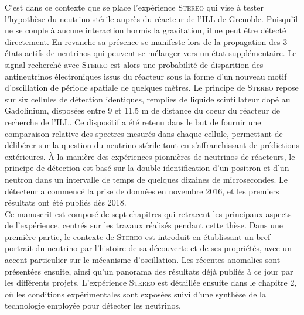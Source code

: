 C'est dans ce contexte que se place l'expérience \textsc{Stereo} qui vise à tester l'hypothèse du neutrino stérile auprès du réacteur de l'ILL de Grenoble. Puisqu'il ne se couple à aucune interaction hormis la gravitation, il ne peut être détecté directement. En revanche sa présence se manifeste lors de la propagation des 3 états actifs de neutrinos qui peuvent se mélanger vers un état supplémentaire. Le signal recherché avec \textsc{Stereo} est alors une probabilité de disparition des antineutrinos électroniques issus du réacteur sous la forme d'un nouveau motif d'oscillation de période spatiale de quelques mètres. Le principe de \textsc{Stereo} repose sur six cellules de détection identiques, remplies de liquide scintillateur dopé au Gadolinium, disposées entre 9 et 11,5 m de distance du coeur du réacteur de recherche de l'ILL. Ce dispositif a été retenu dans le but de fournir une comparaison relative des spectres mesurés dans chaque cellule, permettant de délibérer sur la question du neutrino stérile tout en s'affranchissant de prédictions extérieures. À la manière des expériences pionnières de neutrinos de réacteurs, le principe de détection est basé sur la double identification d'un positron et d'un neutron dans un intervalle de temps de quelques dizaines de microsecondes. Le détecteur a commencé la prise de données en novembre 2016, et les premiers résultats ont été publiés dès 2018.\\

Ce manuscrit est composé de sept chapitres qui retracent les principaux aspects de l'expérience, centrés sur les travaux réalisés pendant cette thèse. Dans une première partie, le contexte de \textsc{Stereo} est introduit en établissant un bref portrait du neutrino par l'histoire de sa découverte et de ses propriétés, avec un accent particulier sur le mécanisme d'oscillation. Les récentes anomalies sont présentées ensuite, ainsi qu'un panorama des résultats déjà publiés à ce jour par les différents projets. L'expérience \textsc{Stereo} est détaillée ensuite dans le chapitre 2, où les conditions expérimentales sont exposées suivi d'une synthèse de la technologie employée pour détecter les neutrinos.\\

